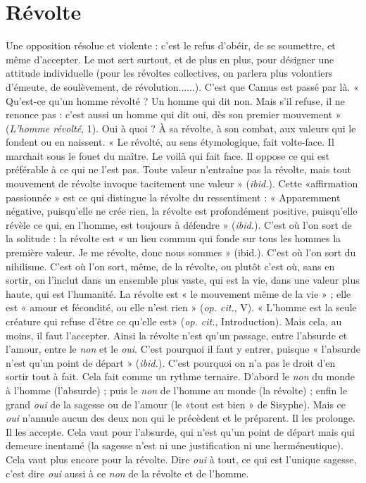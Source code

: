 \section{Révolte}
Une opposition résolue et violente : c’est le refus d’obéir, de se
soumettre, et même d’accepter. Le mot sert surtout, et de plus
en plus, pour désigner une attitude individuelle (pour les révoltes collectives,
on parlera plus volontiers d’émeute, de soulèvement, de révolution......). C’est
que Camus est passé par là. « Qu'est-ce qu’un homme révolté ? Un homme qui
dit non. Mais s’il refuse, il ne renonce pas : c’est aussi un homme qui dit oui,
dès son premier mouvement » ({\it L'homme révolté}, 1). Oui à quoi ? À sa révolte, à
son combat, aux valeurs qui le fondent ou en naissent. « Le révolté, au sens étymologique,
fait volte-face. Il marchait sous le fouet du maître. Le voilà qui fait
face. Il oppose ce qui est préférable à ce qui ne l’est pas. Toute valeur n’entraîne
pas la révolte, mais tout mouvement de révolte invoque tacitement une valeur »
({\it ibid.}). Cette «affirmation passionnée » est ce qui distingue la révolte du
ressentiment : « Apparemment négative, puisqu'elle ne crée rien, la révolte est
profondément positive, puisqu'elle révèle ce qui, en l’homme, est toujours à
défendre » ({\it ibid.}). C’est où l’on sort de la solitude : la révolte est « un lieu
commun qui fonde sur tous les hommes la première valeur. Je me révolte, donc
nous sommes » (ibid.). C’est où l’on sort du nihilisme. C’est où l’on sort,
même, de la révolte, ou plutôt c’est où, sans en sortir, on l’inclut dans un
ensemble plus vaste, qui est la vie, dans une valeur plus haute, qui est l’humanité.
La révolte est « le mouvement même de la vie » ; elle est « amour et fécondité,
ou elle n’est rien » ({\it op. cit.}, V). « L'homme est la seule créature qui refuse
d’être ce qu’elle est» ({\it op. cit.}, Introduction). Mais cela, au moins, il faut
l’accepter. Ainsi la révolte n’est qu’un passage, entre l’absurde et l’amour, entre
le {\it non} et le {\it oui}. C’est pourquoi il faut y entrer, puisque « l'absurde n’est qu’un
point de départ » ({\it ibid.}). C’est pourquoi on n’a pas le droit d’en sortir tout à
fait. Cela fait comme un rythme ternaire. D’abord le {\it non} du monde à l’homme
(l'absurde) ; puis le {\it non} de l’homme au monde (la révolte) ; enfin le grand {\it oui}
de la sagesse ou de l’amour (le «tout est bien » de Sisyphe). Mais ce {\it oui}
n’annule aucun des deux non qui le précèdent et le préparent. Il les prolonge.
Il les accepte. Cela vaut pour l’absurde, qui n’est qu’un point de départ mais
qui demeure inentamé (la sagesse n’est ni une justification ni une herméneutique).
Cela vaut plus encore pour la révolte. Dire {\it oui} à tout, ce qui est l’unique
sagesse, c’est dire {\it oui} aussi à ce {\it non} de la révolte et de l’homme.

